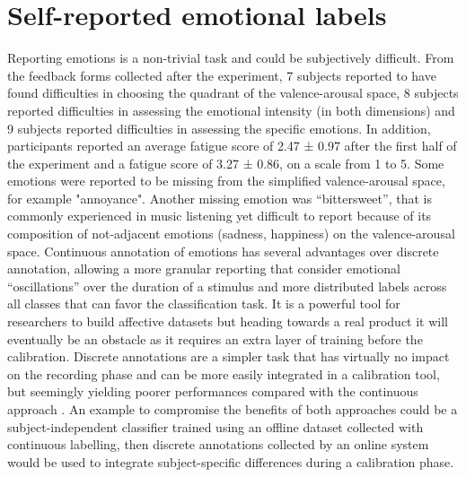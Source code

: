 \section{Self-reported emotional labels}
\label{sec:self_reported_labels}
Reporting emotions is a non-trivial task and could be subjectively difficult. From the feedback forms collected after the experiment, 7 subjects reported to have found difficulties in choosing the quadrant of the valence-arousal space, 8 subjects reported difficulties in assessing the emotional intensity (in both dimensions) and 9 subjects reported difficulties in assessing the specific emotions. In addition, participants reported an average fatigue score of 2.47 ± 0.97 after the first half of the experiment and a fatigue score of 3.27 ± 0.86, on a scale from 1 to 5. Some emotions were reported to be missing from the simplified valence-arousal space, for example "annoyance". Another missing emotion was “bittersweet”, that is commonly experienced in music listening yet difficult to report because of its composition of not-adjacent emotions (sadness, happiness) on the valence-arousal space. Continuous annotation of emotions has several advantages over discrete annotation, allowing a more granular reporting that consider emotional “oscillations” over the duration of a stimulus and more distributed labels across all classes that can favor the classification task.  It is a powerful tool for researchers to build affective datasets but heading towards a real product it will eventually be an obstacle as it requires an extra layer of training before the calibration. Discrete annotations are a simpler task that has virtually no impact on the recording phase and can be more easily integrated in a calibration tool, but seemingly yielding poorer performances compared with the continuous approach \cite{thammasan_continuous_2016}. An example to compromise the benefits of both approaches could be a subject-independent classifier trained using an offline dataset collected with continuous labelling, then discrete annotations collected by an online system would be used to integrate subject-specific differences during a calibration phase.

